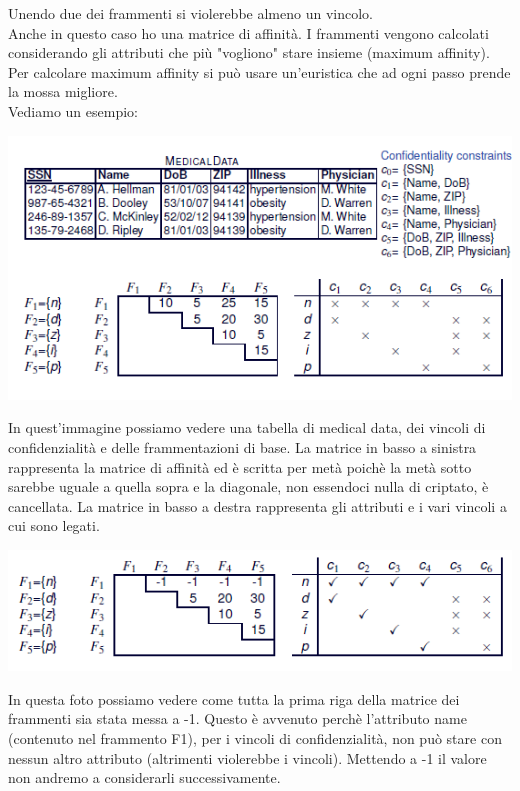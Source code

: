 Unendo due dei frammenti si violerebbe almeno un vincolo.\\
Anche in questo caso ho una matrice di affinità. I frammenti vengono calcolati considerando gli attributi che più "vogliono" stare insieme (maximum affinity).\\
Per calcolare maximum affinity si può usare un'euristica che ad ogni passo prende la mossa migliore.\\
Vediamo un esempio:
\begin{center}
    \includegraphics[scale=0.7]{img/maxaff1.png}
\end{center}
In quest'immagine possiamo vedere una tabella di medical data, dei vincoli di confidenzialità e delle frammentazioni di base. La matrice in basso a sinistra rappresenta la matrice di affinità ed è scritta per metà poichè la metà sotto sarebbe uguale a quella sopra e la diagonale, non essendoci nulla di criptato, è cancellata. La matrice in basso a destra rappresenta gli attributi e i vari vincoli a cui sono legati.
\begin{center}
    \includegraphics[scale=0.7]{img/maxaff2.png}
\end{center}
In questa foto possiamo vedere come tutta la prima riga della matrice dei frammenti sia stata messa a -1. Questo è avvenuto perchè l'attributo name (contenuto nel frammento F1), per i vincoli di confidenzialità, non può stare con nessun altro attributo (altrimenti violerebbe i vincoli). Mettendo a -1 il valore non andremo a considerarli successivamente.\\
